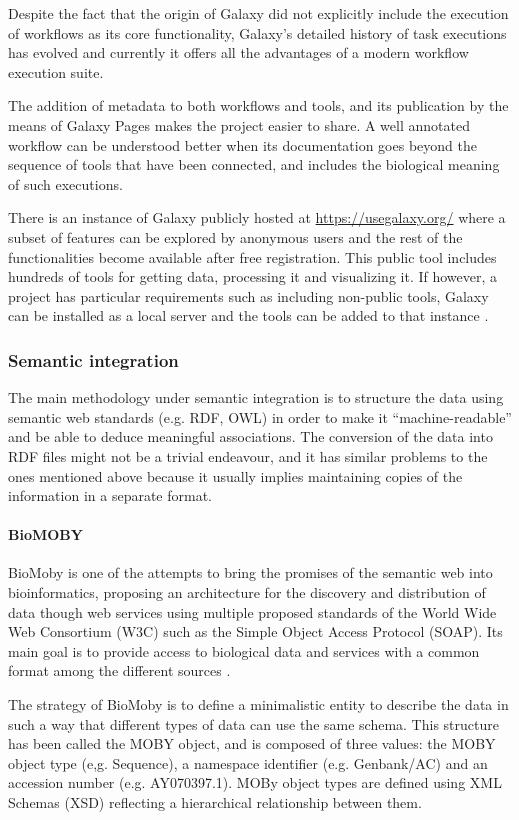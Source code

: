 Despite the fact that the origin of Galaxy did not explicitly include the execution of workflows as its core functionality, Galaxy's detailed history of task executions has evolved and currently it offers all the advantages of a modern workflow execution suite.

The addition of metadata to both workflows and tools, and its publication by the means of Galaxy Pages makes the project easier to share. A well annotated workflow can be understood better when its documentation goes beyond the sequence of tools that have been connected, and includes the biological meaning of such executions.

There is an instance of Galaxy publicly hosted at \url{https://usegalaxy.org/} where a subset of features can be explored by anonymous users and the rest of the functionalities become available after free registration. This public tool includes hundreds of tools for getting data, processing it and visualizing it. If however, a project has particular requirements such as including non-public tools, Galaxy can be installed as a local server and the tools can be added to that instance \cite{GIA2005, GOE2010}.


\subsubsection{Semantic integration} 
The main methodology under semantic integration is to structure the data using semantic web standards (e.g. RDF, OWL) in order to make it ``machine-readable'' and be able to deduce meaningful associations. The conversion of the data into RDF files might not be a trivial endeavour, and it has similar problems to the ones mentioned above because it usually implies maintaining copies of the information in a separate format. 

\paragraph{BioMOBY}
BioMoby is one of the attempts to bring the promises of the semantic web into bioinformatics, proposing an architecture for the discovery and distribution of data though web services using multiple proposed standards of the World Wide Web Consortium (W3C) such as the Simple Object Access Protocol (SOAP). Its main goal is to provide access to biological data and services with a common format among the different sources \cite{WIL2002}.

The strategy of BioMoby is to define a minimalistic entity to describe the data in such a way that different types of data can use the same schema.
This structure has been called the MOBY object, and is composed of three values: the MOBY object type (e,g. Sequence), a namespace identifier (e.g. Genbank/AC) and an accession number (e.g. AY070397.1). MOBy object types are defined using XML Schemas (XSD) reflecting a hierarchical relationship between them.

